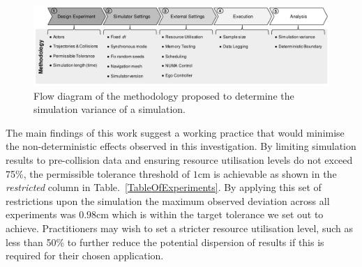 \documentclass[letterpaper, 10 pt, journal, twoside]{IEEEtran}
\begin{document}
%
\begin{figure}[b]
    \centering
    \includegraphics[width=0.99\linewidth]{Other/Figures/Methodology_Diagram_v4.pdf}
    \caption{Flow diagram of the methodology proposed to determine the simulation variance of a simulation.}
    \label{method_diagram}
\end{figure}

 
The main findings of this work suggest a working practice that would minimise the non-deterministic effects observed in this investigation. By limiting simulation results to pre-collision data and ensuring resource utilisation levels do not exceed 75\%, the permissible tolerance threshold of $1$cm is achievable as shown in the \textit{restricted} column in Table.~\ref{TableOfExperiments}. By applying this set of restrictions upon the simulation the maximum observed deviation across all experiments was $0.98$cm which is within the target tolerance we set out to achieve. 
%
Practitioners may wish to set a stricter resource utilisation level, such as less than 50\% to further reduce the potential dispersion of results if this is required for their chosen application. 
%
\end{document}
